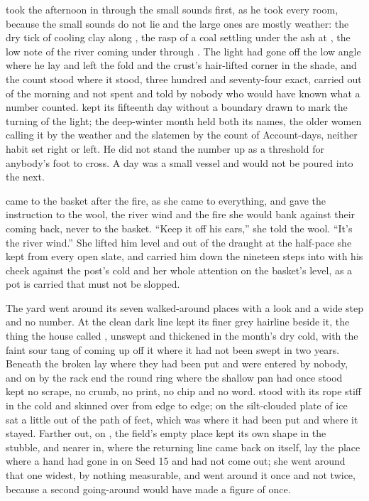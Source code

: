  took the afternoon in through the small sounds first, as he took every room, because the small sounds do not lie and the large ones are mostly weather: the dry tick of cooling clay along , the rasp of a coal settling under the ash at , the low note of the river coming under  through . The light had gone off the low angle where he lay and left the fold and the crust's hair-lifted corner in the shade, and the count stood where it stood, three hundred and seventy-four exact, carried out of the morning and not spent and told by nobody who would have known what a number counted.  kept its fifteenth day without a boundary drawn to mark the turning of the light; the deep-winter month held both its names, the older women calling it by the weather and the slatemen by the count of Account-days, neither habit set right or left. He did not stand the number up as a threshold for anybody's foot to cross. A day was a small vessel and would not be poured into the next.

 came to the basket after the fire, as she came to everything, and gave the instruction to the wool, the river wind and the fire she would bank against their coming back, never to the basket. “Keep it off his ears,” she told the wool. “It's the river wind.” She lifted him level and out of the draught at the half-pace she kept from every open slate, and carried him down the nineteen steps into  with his cheek against the post's cold and her whole attention on the basket's level, as a pot is carried that must not be slopped.

The yard went around its seven walked-around places with a look and a wide step and no number. At  the clean dark line kept its finer grey hairline beside it, the thing the house called , unswept and thickened in the month's dry cold, with the faint sour tang of  coming up off it where it had not been swept in two years. Beneath  the broken  lay where they had been put and were entered by nobody, and on  by the rack end the round ring where the shallow pan had once stood kept no scrape, no crumb, no print, no chip and no word.  stood with its rope stiff in the cold and  skinned over from edge to edge; on  the silt-clouded plate of ice sat a little out of the path of feet, which was where it had been put and where it stayed. Farther out, on , the field's empty place kept its own shape in the stubble, and nearer in, where the returning line came back on itself, lay the place where a hand had gone in on Seed 15 and had not come out; she went around that one widest, by nothing measurable, and went around it once and not twice, because a second going-around would have made a figure of once.

